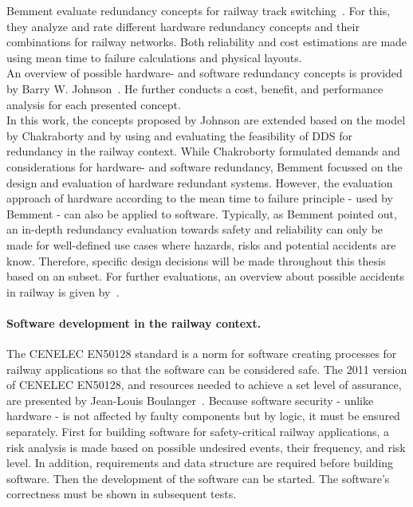 Bemment \etal evaluate redundancy concepts for railway track switching~\cite{BemmentEvaluationOfRedundancy}.
For this, they analyze and rate different hardware redundancy concepts and their combinations for railway networks.
Both reliability and cost estimations are made using mean time to failure calculations and physical layouts.
\\

An overview of possible hardware- and software redundancy concepts is provided by Barry W. Johnson~\cite{BarryFaultToleranceAnalysis}.
He further conducts a cost, benefit, and performance analysis for each presented concept.
\\

In this work, the concepts proposed by Johnson are extended based on the model by Chakraborty and by using and evaluating the feasibility of \gls*{DDS} for redundancy in the railway context.
While Chakroborty formulated demands and considerations for hardware- and software redundancy, Bemment \etal focussed on the design and evaluation of hardware redundant systems.
However, the evaluation approach of hardware according to the mean time to failure principle - used by Bemment \etal - can also be applied to software.
Typically, as Bemment \etal pointed out, an in-depth redundancy evaluation towards safety and reliability can only be made for well-defined use cases where hazards, risks and potential accidents are know.
Therefore, specific design decisions will be made throughout this thesis based on an  subset.
For further evaluations, an overview about possible accidents in railway is given by~\cite{ERTMSRailwayAccidents}.


\paragraph{Software development in the railway context.}
The CENELEC EN50128 standard is a norm for software creating processes for railway applications so that the software can be considered safe.
The 2011 version of CENELEC EN50128, and resources needed to achieve a set level of assurance, are presented by Jean-Louis Boulanger~\cite{BoulangerStandards}.
Because software security - unlike hardware - is not affected by faulty components but by logic, it must be ensured separately.
First for building software for safety-critical railway applications, a risk analysis is made based on possible undesired events, their frequency, and risk level.
In addition, requirements and data structure are required before building software.
Then the development of the software can be started.
The software's correctness must be shown in subsequent tests.
\\

